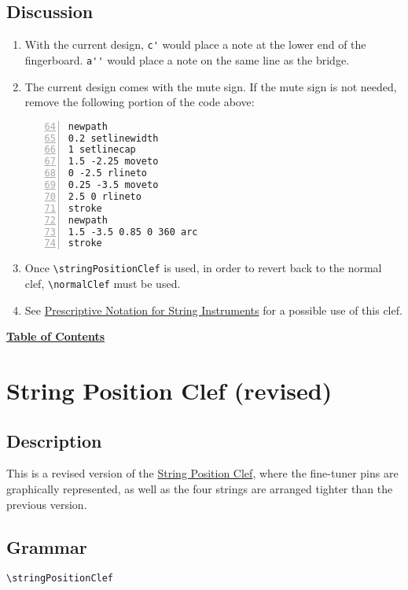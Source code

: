 \subsection{Discussion}
\begin{enumerate}
\item With the current design, \verb|c'| would place a note at the lower end of the fingerboard. \verb|a''| would place a note on the same line as the bridge. 

\item The current design comes with the mute sign. If the mute sign is not needed, remove the following portion of the code above:

\begin{Verbatim}[numbers=left,xleftmargin=5mm,firstnumber=64]
%mutesign
newpath
0.2 setlinewidth
1 setlinecap
1.5 -2.25 moveto
0 -2.5 rlineto
0.25 -3.5 moveto
2.5 0 rlineto
stroke
newpath
1.5 -3.5 0.85 0 360 arc
stroke
\end{Verbatim}

\item Once \verb|\stringPositionClef| is used, in order to revert back to the normal clef, \verb|\normalClef| must be used.
\item See \hyperref[sec:comb_strings]{Prescriptive Notation for String Instruments} for a possible use of this clef.
\end{enumerate}

\hyperref[sec:toc]{\textbf{Table of Contents}}

\vfill \break


\section {String Position Clef (revised)}
\hfill
{}
\hfill

\subsection{Description}
This is a revised version of the \hyperref[sec:stringPositionClef]{String Position Clef}, where the fine-tuner pins are graphically represented, as well as the four strings are arranged tighter than the previous version.
\subsection{Grammar}
\begin{verbatim}
\stringPositionClef 
\end{verbatim}
